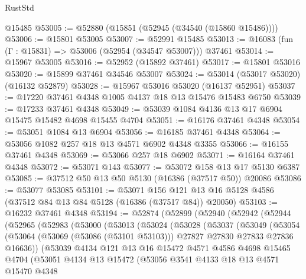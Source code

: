 \begin{lexlean}{RustStd}
\begin{coremodule}
    @15485
@53005 := @52880 (@15851 (@52945 (@34540 (@15860 @15486))))
@53006 := @15801 @53005
@53007 := @52991 @15485
@53013 := @16083 (fun (Γ : @15831) => @53006 (@52954 (@34547 @53007))) @37461
@53014 := @15967 @53005
@53016 := @52952 (@15892 @37461)
@53017 := @15801 @53016
@53020 := @15899 @37461 @34546 @53007
@53024 := @53014 (@53017 @53020) (@16132 @52879)
@53028 := @15967 @53016 @53020 (@16137 @52951)
@53037 := @17220 @37461 @4348 @1005 @4137 @18 @13 @15476 @15483 @6750
@53039 := @17233 @37461 @4348
@53049 := @53039 @1084 @4136 @13 @17 @6904 @15475 @15482 @4698 @15455 @4704
@53051 := @16176 @37461 @4348
@53054 := @53051 @1084 @13 @6904
@53056 := @16185 @37461 @4348
@53064 := @53056 @1082 @257 @18 @13 @4571 @6902 @4348 @3355
@53066 := @16155 @37461 @4348
@53069 := @53066 @257 @18 @6902
@53071 := @16164 @37461 @4348
@53072 := @53071 @143
@53077 := @53072 @158 @13 @17 @5130 @6387
@53085 := @37512 @50 @13 @50 @5130 (@16386 (@37517 @50)) @20086
@53086 := @53077 @53085
@53101 := @53071
    @156
    @121
    @13
    @16
    @5128
    @4586
    (@37512 @84 @13 @84 @5128 (@16386 (@37517 @84)) @20050)
@53103 := @16232 @37461 @4348
@53194 := @52874
    (@52899
      (@52940
        (@52942
          (@52944
            (@52965
              (@52983
                (@53000
                  (@53013
                    (@53024
                      (@53028
                        (@53037
                          (@53049
                            (@53054
                              (@53064
                                (@53069 (@53086 (@53101 @53103)))
                                @27827
                                @27830
                                @27833
                                @27836
                                @16636))
                            (@53039
                              @4134
                              @121
                              @13
                              @16
                              @15472
                              @4571
                              @4586
                              @4698
                              @15465
                              @4704
                              (@53051
                                @4134
                                @13
                                @15472
                                (@53056
                                  @3541
                                  @4133
                                  @18
                                  @13
                                  @4571
                                  @15470
                                  @4348

\end{coremodule}
\end{lexlean}
